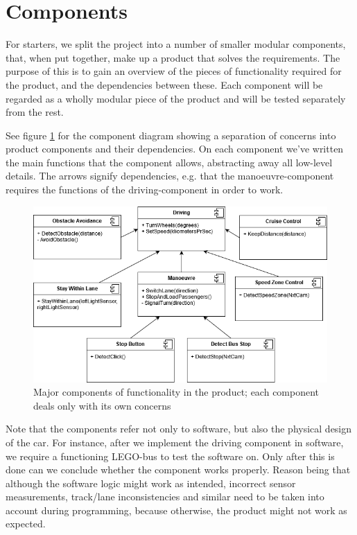 \section{Components}

For starters, we split the project into a number of smaller modular components, that, when put together, make up a product that solves the requirements. The purpose of this is to gain an overview of the pieces of functionality required for the product, and the dependencies between these. Each component will be regarded as a wholly modular piece of the product and will be tested separately from the rest. 


See figure \ref{fig:components} for the component diagram showing a separation of concerns into product components and their dependencies. On each component we've written the main functions that the component allows, abstracting away all low-level details. The arrows signify dependencies, e.g. that the manoeuvre-component requires the functions of the driving-component in order to work. 

\begin{figure}[ht]
    \includegraphics[width=\textwidth]{Images/Design/componentDiagram.png}
    \caption{Major components of functionality in the product; each component deals only with its own concerns}
    \label{fig:components}
\end{figure}

Note that the components refer not only to software, but also the physical design of the car. For instance, after we implement the driving component in software, we require a functioning LEGO-bus to test the software on. Only after this is done can we conclude whether the component works properly. Reason being that although the software logic might work as intended, incorrect sensor measurements, track/lane inconsistencies and similar need to be taken into account during programming, because otherwise, the product might not work as expected.

